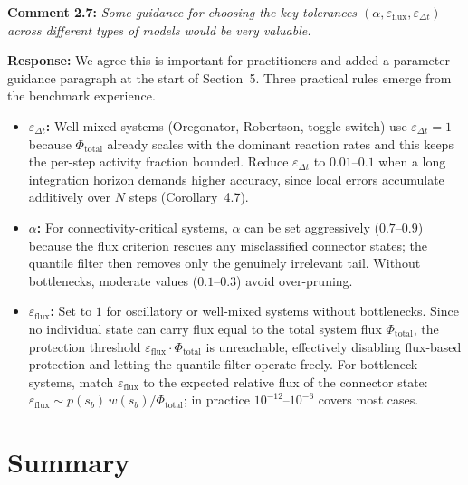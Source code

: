 \documentclass[11pt]{article}
\begin{document}
\medskip

\noindent\textbf{Comment 2.7:} \textit{Some guidance for choosing the key
tolerances $(\alpha, \varepsilon_{\mathrm{flux}}, \varepsilon_{\Delta t})$
across different types of models would be very valuable.}

\textbf{Response:} We agree this is important for practitioners and added a
parameter guidance paragraph at the start of Section~5.  Three practical rules
emerge from the benchmark experience.

\begin{itemize}
  \item \textbf{$\varepsilon_{\Delta t}$:} Well-mixed systems (Oregonator, Robertson, toggle switch) use $\varepsilon_{\Delta t} = 1$ because $\Phi_{\mathrm{total}}$ already scales with the dominant reaction rates and this keeps the per-step activity fraction bounded.
  Reduce $\varepsilon_{\Delta t}$ to $0.01$--$0.1$ when a long integration horizon demands higher accuracy, since local errors accumulate additively over $N$ steps (Corollary~4.7).

  \item \textbf{$\alpha$:} For connectivity-critical systems, $\alpha$ can be set aggressively ($0.7$--$0.9$) because the flux criterion rescues any misclassified connector states; the quantile filter then removes only the genuinely irrelevant tail.
  Without bottlenecks, moderate values ($0.1$--$0.3$) avoid over-pruning.

  \item \textbf{$\varepsilon_{\mathrm{flux}}$:} Set to $1$ for oscillatory or well-mixed systems without bottlenecks.
  Since no individual state can carry flux equal to the total system flux $\Phi_{\mathrm{total}}$, the protection threshold $\varepsilon_{\mathrm{flux}}\cdot\Phi_{\mathrm{total}}$ is unreachable, effectively disabling flux-based protection and letting the quantile filter operate freely.
  For bottleneck systems, match $\varepsilon_{\mathrm{flux}}$ to the expected relative flux of the connector state: $\varepsilon_{\mathrm{flux}}\sim p(s_b)\,w(s_b)/\Phi_{\mathrm{total}}$; in practice $10^{-12}$--$10^{-6}$ covers most cases.
\end{itemize}

\section*{Summary}
\end{document}
